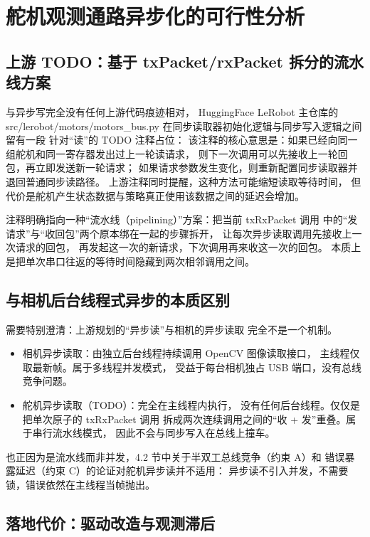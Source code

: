 \section{舵机观测通路异步化的可行性分析}\label{sec:async-read}

\subsection{上游 TODO：基于 txPacket/rxPacket 拆分的流水线方案}\label{sec:async-read-todo}

与异步写完全没有任何上游代码痕迹相对，
HuggingFace LeRobot 主仓库的
src/lerobot/motors/motors\_bus.py
在同步读取器初始化逻辑与同步写入逻辑之间留有一段
针对``读''的 TODO 注释占位：
该注释的核心意思是：如果已经向同一组舵机和同一寄存器发出过上一轮读请求，
则下一次调用可以先接收上一轮回包，再立即发送新一轮请求；
如果请求参数发生变化，则重新配置同步读取器并退回普通同步读路径。
上游注释同时提醒，这种方法可能缩短读取等待时间，
但代价是舵机产生状态数据与策略真正使用该数据之间的延迟会增加。

注释明确指向一种``流水线（pipelining）''方案：把当前 txRxPacket 调用
中的``发请求''与``收回包''两个原本绑在一起的步骤拆开，
让每次异步读取调用先接收上一次请求的回包，
再发起这一次的新请求，下次调用再来收这一次的回包。
本质上是把单次串口往返的等待时间隐藏到两次相邻调用之间。

\subsection{与相机后台线程式异步的本质区别}\label{sec:async-read-not-thread}

需要特别澄清：上游规划的``异步读''与相机的异步读取
完全不是一个机制。
\begin{itemize}[leftmargin=2em]
  \item 相机异步读取：由独立后台线程持续调用 OpenCV 图像读取接口，
        主线程仅取最新帧。属于多线程并发模式，
        受益于每台相机独占 USB 端口，没有总线竞争问题。
  \item 舵机异步读取（TODO）：完全在主线程内执行，
        没有任何后台线程。仅仅是把单次原子的 txRxPacket 调用
        拆成两次连续调用之间的``收 + 发''重叠。属于串行流水线模式，
        因此不会与同步写入在总线上撞车。
\end{itemize}

也正因为是流水线而非并发，4.2 节中关于半双工总线竞争（约束 A）和
错误暴露延迟（约束 C）的论证对舵机异步读并不适用：
异步读不引入并发，不需要锁，错误依然在主线程当帧抛出。

\subsection{落地代价：驱动改造与观测滞后}\label{sec:async-read-cost}


